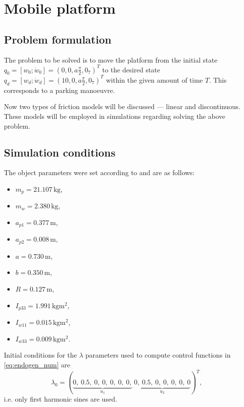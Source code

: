 \section{Mobile platform}
\subsection{Problem formulation}
\label{sec:rex_task}
The problem to be solved is to move the platform from the initial state
$q_0 = [w_0; \dot{w}_0] = (0, 0, a\frac{\pi}{2}, 0_7)^T$ to the desired state
$q_d = [w_d; \dot{w}_d] = (10, 0, a\frac{\pi}{2}, 0_7)^T$
within the given amount of time $T$. 
This corresponds to a parking manoeuvre.

Now two types of friction models will be discussed --- linear
and discontinuous. These models will be employed in simulations
regarding solving the above problem.

\subsection{Simulation conditions}
The object parameters were set according to \cite{coupled} and are as follows:
\begin{multicols}{2}
\begin{itemize}
\item $m_p = 21.107\,\mathrm{kg}$,
\item $m_w = 2.380\,\mathrm{kg}$,
\item $a_{p1} = 0.377\,\mathrm{m}$,
\item $a_{p2} = 0.008\,\mathrm{m}$,
\item $a = 0.730\,\mathrm{m}$,
\item $b = 0.350\,\mathrm{m}$,
\item $R = 0.127\,\mathrm{m}$,
\item $I_{p33} = 1.991\,\mathrm{kgm^2}$,
\item $I_{w11} = 0.015\,\mathrm{kgm^2}$,
\item $I_{w33} = 0.009\,\mathrm{kgm^2}$.
\end{itemize}
\end{multicols}
\setcounter{MaxMatrixCols}{14}
Initial conditions for the $\lambda$ parameters used to compute control functions
in \eqref{eq:endogen_num} are
\begin{equation}
\lambda_0=
(\underbrace{0, \ 0.5, \ 0, \ 0, \ 0, \ 0, \ 0,}_{u_1}\ \underbrace{0, \ 0.5, \ 0, \ 0, \ 0, \ 0, \ 0}_{u_2})^T,
\end{equation}
i.e. only first harmonic sines are used.
 	

